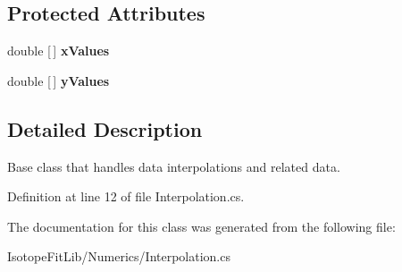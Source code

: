\subsection*{Protected Attributes}
\begin{DoxyCompactItemize}
\item 
\mbox{\label{class_isotope_fit_1_1_interpolation_acf6347fae287029b998501472537d0a4}} 
double \mbox{[}$\,$\mbox{]} {\bfseries x\+Values}
\item 
\mbox{\label{class_isotope_fit_1_1_interpolation_adaf07c17ecb29957a3daf18b35947468}} 
double \mbox{[}$\,$\mbox{]} {\bfseries y\+Values}
\end{DoxyCompactItemize}


\subsection{Detailed Description}
Base class that handles data interpolations and related data. 



Definition at line 12 of file Interpolation.\+cs.



The documentation for this class was generated from the following file\+:\begin{DoxyCompactItemize}
\item 
Isotope\+Fit\+Lib/\+Numerics/Interpolation.\+cs\end{DoxyCompactItemize}
